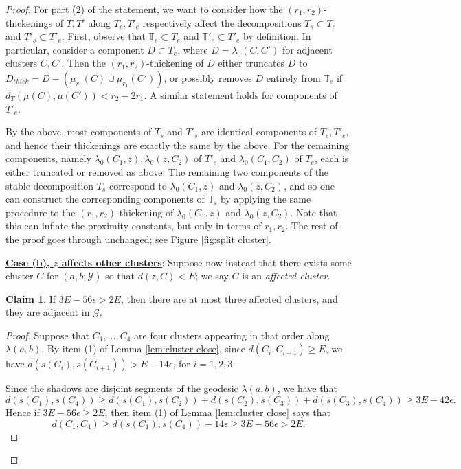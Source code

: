 \documentclass{amsart}
\theoremstyle{definition}
\newtheorem{claim}[theorem]{Claim}
\theoremstyle{remark}
\theoremstyle{definition}
\newcommand{\calG}{\mathcal{G}}
\newcommand{\calY}{\mathcal{Y}}
\newcommand{\bT}{\mathbb{T}}
\begin{document}
\begin{proof}
For part (2) of the statement, we want to consider how the $(r_1,r_2)$-thickenings of $T,T'$ along $T_c,T'_c$ respectively affect the decompositions $T_s \subset T_e$ and $T'_s \subset T'_e$.  First, observe that $\bT_e \subset T_e$ and $\bT'_e \subset T'_e$ by definition.  In particular, consider a component $D \subset T_e$, where $D = \lambda_0(C,C')$ for adjacent clusters $C,C'$.  Then the $(r_1,r_2)$-thickening of $D$ either truncates $D$ to $D_{thick} = D - (\mu_{r_1}(C) \cup \mu_{r_1}(C'))$, or possibly removes $D$ entirely from $\bT_e$ if $d_T(\mu(C), \mu(C'))<r_2-2r_1$.  A similar statement holds for components of $T'_e$.

By the above, most components of $T_s$ and $T'_s$ are identical components of $T_e, T'_e$, and hence their thickenings are exactly the same by the above.  For the remaining components, namely $\lambda_0(C_1,z), \lambda_0(z,C_2)$ of $T'_e$ and $\lambda_0(C_1,C_2)$ of $T_e$, each is either truncated or removed as above.  The remaining two components of the stable decomposition $T_s$ correspond to $\lambda_0(C_1,z)$ and $\lambda_0(z,C_2)$, and so one can construct the corresponding components of $\bT_s$ by applying the same procedure to the $(r_1,r_2)$-thickening of $\lambda_0(C_1,z)$ and $\lambda_0(z,C_2)$.  Note that this can inflate the proximity constants, but only in terms of $r_1,r_2$.  The rest of the proof goes through unchanged; see Figure \ref{fig:split cluster}.




\medskip

\underline{\textbf{Case (b), $z$ affects other clusters}}: Suppose now instead that there exists some cluster $C$ for $(a,b;\calY)$ so that $d(z,C)<E$; we say $C$ is an  \emph{affected cluster}.

\begin{claim}\label{claim:bounded affect}
If $3E - 56\epsilon > 2E$, then there are at most three affected clusters, and they are adjacent in $\calG$.
\end{claim}

\begin{proof}
Suppose that $C_1,\dots, C_4$ are four clusters appearing in that order along $\lambda(a,b)$.  By item (1) of Lemma \ref{lem:cluster close}, since $d(C_i, C_{i+1})\geq E$, we have $d(s(C_i), s(C_{i+1}))> E - 14\epsilon$, for $i = 1,2,3$.

Since the shadows are disjoint segments of the geodesic $\lambda(a,b)$, we have that
$$d(s(C_1), s(C_4)) \geq d(s(C_1), s(C_2)) + d(s(C_2), s(C_3))+d(s(C_3), s(C_4)) \geq 3E -42\epsilon.$$
Hence if $3E-56\epsilon \geq 2E$, then item (1) of Lemma \ref{lem:cluster close} says that 
$$d(C_1,C_4) \geq d(s(C_1),s(C_4)) - 14\epsilon \geq 3E-56\epsilon > 2E.$$


\end{proof}
\end{proof}
\end{document}
